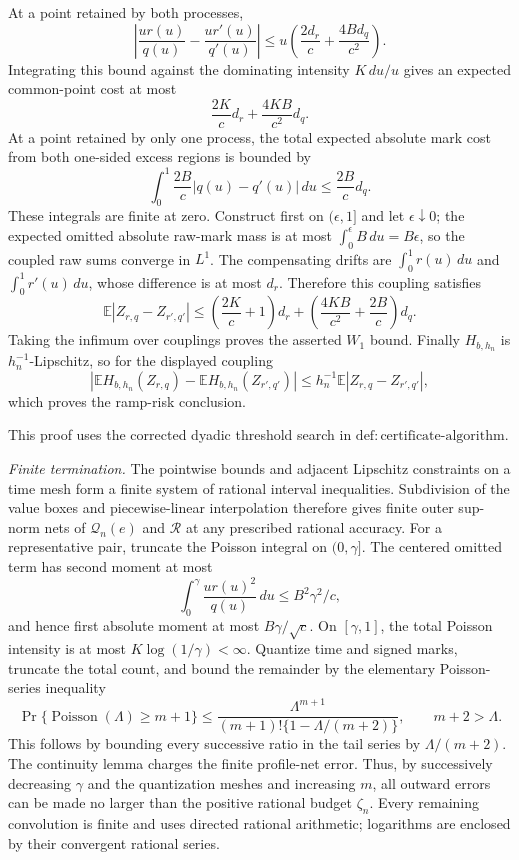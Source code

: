 At a point retained by both processes,
\[
 \left|\frac{ur(u)}{q(u)}-\frac{ur'(u)}{q'(u)}\right|
 \leq u\left(\frac{2d_r}{c}+\frac{4B d_q}{c^2}\right).
\]
Integrating this bound against the dominating intensity \(K\,du/u\) gives an expected common-point cost at most
\[
 \frac{2K}{c}d_r+\frac{4KB}{c^2}d_q.
\]
At a point retained by only one process, the total expected absolute mark cost from both one-sided excess regions is bounded by
\[
 \int_0^1\frac{2B}{c}|q(u)-q'(u)|\,du
 \leq\frac{2B}{c}d_q.
\]
These integrals are finite at zero.  Construct first on \((\epsilon,1]\) and let
\(\epsilon\downarrow0\); the expected omitted absolute raw-mark mass is at most
\(\int_0^\epsilon B\,du=B\epsilon\), so the coupled raw sums converge in \(L^1\).
The compensating drifts are \(\int_0^1r(u)\,du\) and
\(\int_0^1r'(u)\,du\), whose difference is at most \(d_r\).
Therefore this coupling satisfies
\[
 \mathbb E|Z_{r,q}-Z_{r',q'}|
 \leq\left(\frac{2K}{c}+1\right)d_r
 +\left(\frac{4KB}{c^2}+\frac{2B}{c}\right)d_q.
\]
Taking the infimum over couplings proves the asserted \(W_1\) bound.
Finally \(H_{b,h_n}\) is \(h_n^{-1}\)-Lipschitz, so for the displayed coupling
\[
 \left|\mathbb EH_{b,h_n}(Z_{r,q})
       -\mathbb EH_{b,h_n}(Z_{r',q'})\right|
 \leq h_n^{-1}\mathbb E|Z_{r,q}-Z_{r',q'}|,
\]
which proves the ramp-risk conclusion.

This proof uses the corrected dyadic threshold search in
\(\mathrm{def:certificate\mbox{-}algorithm}\).

\emph{Finite termination.}
The pointwise bounds and adjacent Lipschitz constraints on a time mesh form a finite system of rational interval inequalities.  Subdivision of the value boxes and piecewise-linear interpolation therefore gives finite outer sup-norm nets of
\(\mathcal Q_n(e)\) and \(\mathcal R\) at any prescribed rational accuracy.
For a representative pair, truncate the Poisson integral on \((0,\gamma]\).
The centered omitted term has second moment at most
\[
 \int_0^\gamma\frac{u r(u)^2}{q(u)}\,du
 \leq B^2\gamma^2/c,
\]
and hence first absolute moment at most \(B\gamma/\sqrt c\).
On \([\gamma,1]\), the total Poisson intensity is at most
\(K\log(1/\gamma)<\infty\).  Quantize time and signed marks, truncate the total count, and bound the remainder by the elementary Poisson-series inequality
\[
 \Pr\{\operatorname{Poisson}(\Lambda)\geq m+1\}
 \leq\frac{\Lambda^{m+1}}
 {(m+1)!\{1-\Lambda/(m+2)\}},
 \qquad m+2>\Lambda.
\]
This follows by bounding every successive ratio in the tail series by
\(\Lambda/(m+2)\).  The continuity lemma charges the finite profile-net error.
Thus, by successively decreasing \(\gamma\) and the quantization meshes and increasing \(m\), all outward errors can be made no larger than the positive rational budget \(\zeta_n\).  Every remaining convolution is finite and uses directed rational arithmetic; logarithms are enclosed by their convergent rational series.

